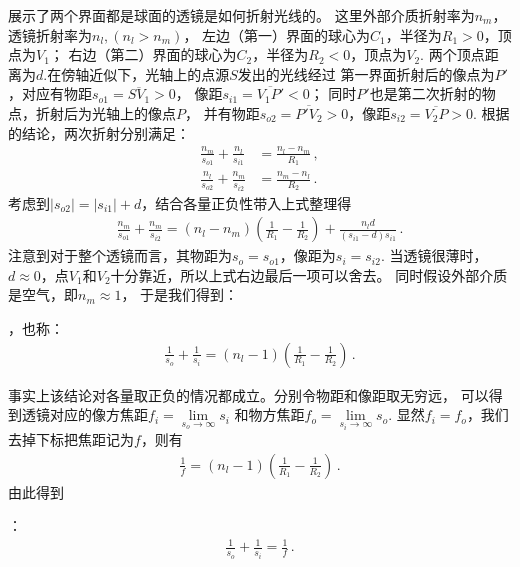 展示了两个界面都是球面的透镜是如何折射光线的。
这里外部介质折射率为$n_m$，透镜折射率为$n_l, (n_l>n_m)$，
左边（第一）界面的球心为$C_1$，半径为$R_1>0$，顶点为$V_1$；
右边（第二）界面的球心为$C_2$，半径为$R_2<0$，顶点为$V_2$.
两个顶点距离为$d$.在傍轴近似下，光轴上的点源$S$发出的光线经过
第一界面折射后的像点为$P'$，对应有物距$s_{o1}=\overline{SV_1}>0$，
像距$s_{i1}=\overline{V_1P'}<0$；
同时$P'$也是第二次折射的物点，折射后为光轴上的像点$P$，
并有物距$s_{o2}=\overline{P'V_2}>0$，像距$s_{i2}=\overline{V_2P}>0$.
根据的结论，两次折射分别满足：
\begin{align}
    \frac{n_m}{s_{o1}}+\frac{n_l}{s_{i1}} & =\frac{n_l-n_m}{R_1}\, , \\
    \frac{n_l}{s_{o2}}+\frac{n_m}{s_{i2}} & =\frac{n_m-n_l}{R_2}\, .
\end{align}
考虑到$|s_{o2}|=|s_{i1}|+d$，结合各量正负性带入上式整理得
\begin{align}
    \frac{n_m}{s_{o1}}+\frac{n_m}{s_{i2}}=(n_l-n_m)\left(\frac{1}{R_1}-\frac{1}{R_2}\right)+\frac{n_ld}{(s_{i1}-d)s_{i1}}\, .
\end{align}
注意到对于整个透镜而言，其物距为$s_o=s_{o1}$，像距为$s_i=s_{i2}$.
当透镜很薄时，$d\approx 0$，点$V_1$和$V_2$十分靠近，所以上式右边最后一项可以舍去。
同时假设外部介质是空气，即$n_m\approx 1$，
于是我们得到：
\begin{proposition}
    ，也称：
    \begin{align}
        \frac{1}{s_o}+\frac{1}{s_i}=(n_l-1)\left(\frac{1}{R_1}-\frac{1}{R_2}\right)\, .
    \end{align}
\end{proposition}

事实上该结论对各量取正负的情况都成立。分别令物距和像距取无穷远，
可以得到透镜对应的像方焦距$f_i=\lim\limits_{s_o\to\infty}s_i$
和物方焦距$f_o=\lim\limits_{s_i\to\infty}s_o$.
显然$f_i=f_o$，我们去掉下标把焦距记为$f$，则有
\begin{align}
    \frac{1}{f}=(n_l-1)\left(\frac{1}{R_1}-\frac{1}{R_2}\right)\, .
\end{align}
由此得到
\begin{proposition}
    ：
    \begin{align}
        \frac{1}{s_o}+\frac{1}{s_i}=\frac{1}{f}\, .
    \end{align}
\end{proposition}

